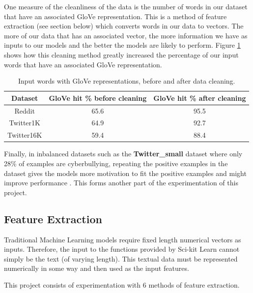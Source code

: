 \documentclass[12pt,a4paper]{article}
\begin{document}
One measure of the cleanliness of the data is the number of words in our dataset that have an associated GloVe representation. This is a method of feature extraction (see section below) which converts words in our data to vectors. The more of our data that has an associated vector, the more information we have as inputs to our models and the better the models are likely to perform. Figure \ref{glove} shows how this cleaning method greatly increased the percentage of our input words that have an associated GloVe representation.

\begin{table}[htb]
	\centering
	\caption{Input words with GloVe representations, before and after data cleaning.}
	\vspace*{6pt}
	\label{glove}
	\begin{tabular}{ccc}\hline\hline
		\textbf{Dataset} & \textbf{GloVe hit \% before cleaning} & \textbf{GloVe hit \% after cleaning} \\ \hline
		Reddit & 65.6 & 95.5 \\ 
		Twitter1K & 64.9 & 92.7 \\
		Twitter16K & 59.4 & 88.4 \\
	\end{tabular}
\end{table}

Finally, in inbalanced datasets such as the \textbf{Twitter\_small} dataset where only 28\% of examples are cyberbullying, repeating the positive examples in the dataset gives the models more motivation to fit the positive examples and might improve performance \cite{Reynolds}. This forms another part of the experimentation of this project.


\subsection{Feature Extraction}
Traditional Machine Learning models require fixed length numerical vectors as inputs. Therefore, the input to the functions provided by Sci-kit Learn cannot simply be the text (of varying length). This textual data must be represented numerically in some way and then used as the input features.

This project consists of experimentation with 6 methods of feature extraction.
\end{document}
